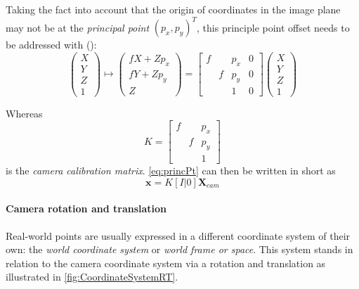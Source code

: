 Taking the fact into account that the origin of coordinates in the image plane may not be at the \textit{principal point} $(p_x, p_y)^T$, this principle point offset needs to be addressed with (\cite[p.155]{Hartley.2011}):
\begin{equation} 
 \begin{pmatrix}
  X \\
  Y \\
  Z \\
  1
 \end{pmatrix}\longmapsto
 \begin{pmatrix}
  fX+Zp_x \\
  fY+Zp_y \\
  Z
 \end{pmatrix}=
 \begin{bmatrix}
  f & & p_x & 0\\
   & f & p_y & 0 \\
   &  & 1 & 0
 \end{bmatrix}
 \begin{pmatrix}
  X \\
  Y \\
  Z \\
  1
 \end{pmatrix}\label{eq:princPt}
\end{equation} 

Whereas 
\begin{equation}
 K=
 \begin{bmatrix}
  f & & p_x\\
   & f & p_y\\
   &  & 1
 \end{bmatrix}
\end{equation}
is the \textit{camera calibration matrix}. \autoref{eq:princPt} can then be written in short as 
\begin{equation}
 \mathbf{x}=K[I|0]\mathbf{X}_{cam}\label{eq:princPtShort}
\end{equation}


\paragraph{Camera rotation and translation}
Real-world points are usually expressed in a different coordinate system of their own: the \textit{world coordinate system} or \textit{world frame or space}. This system stands in relation to the camera coordinate system via a rotation and translation as illustrated in \autoref{fig:CoordinateSystemRT}.

